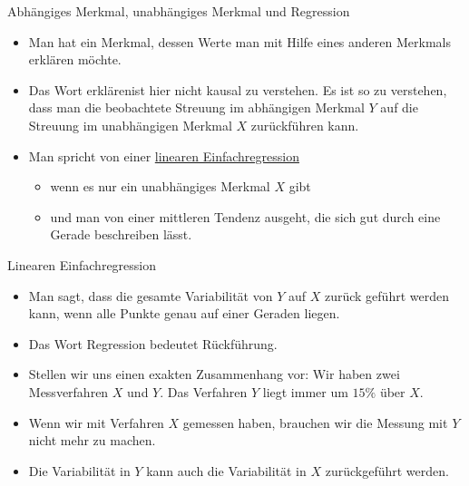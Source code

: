 \documentclass[usenames,dvipsnames,handout]{beamer}
\begin{document}
\begin{frame}{Abhängiges Merkmal, unabhängiges Merkmal und Regression}
\begin{itemize}
\item{Man hat ein Merkmal, dessen Werte man mit Hilfe eines anderen Merkmals
erklären möchte.}
\item{Das Wort \glqq erklären\grqq ist hier nicht kausal zu verstehen. Es ist so zu verstehen,
dass man die beobachtete Streuung im abhängigen Merkmal $Y$ auf die Streuung
im unabhängigen Merkmal $X$ zurückführen kann.}
\item{Man spricht von einer \underline{linearen Einfachregression}}
\begin{itemize}
\item{wenn es nur ein unabhängiges Merkmal $X$ gibt}
\item{und man von einer mittleren Tendenz ausgeht, die sich gut durch eine Gerade beschreiben lässt.}
\end{itemize}
\end{itemize}
\end{frame}

\begin{frame}{Linearen Einfachregression}
\begin{itemize}
\item{Man sagt, dass die gesamte Variabilität von $Y$ auf $X$ zurück geführt werden kann,
wenn alle Punkte genau auf einer Geraden liegen.}
\item{Das Wort Regression bedeutet Rückführung.}
\item{Stellen wir uns einen exakten Zusammenhang vor: Wir haben zwei Messverfahren $X$
und $Y.$ Das Verfahren $Y$ liegt immer um $15\%$ über $X.$}
\item{Wenn wir mit Verfahren $X$ gemessen haben, brauchen wir die Messung mit $Y$
nicht mehr zu machen.}
\item{Die Variabilität in $Y$ kann auch die Variabilität in $X$ zurückgeführt werden.}
\end{itemize}
\end{frame}
\end{document}
